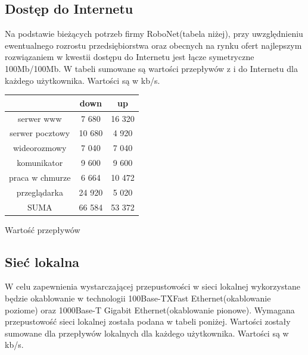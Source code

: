\documentclass{article}
\begin{document}
\subsection{Dostęp do Internetu}
Na podstawie bieżących potrzeb firmy RoboNet(tabela niżej), przy uwzględnieniu ewentualnego rozrostu przedsiębiorstwa oraz obecnych na rynku ofert najlepszym rozwiązaniem w kwestii dostępu do Internetu jest łącze symetryczne 100Mb/100Mb.\newline
W tabeli sumowane są wartości przepływów z i do Internetu dla każdego użytkownika. Wartości są w kb/s.
\newline
\begin{Tabela}[!ht]
	\centering
\begin{tabular}{|c|c|c|} \hline
	& down & up \\
	\hline
	serwer www & 7 680 & 16 320\\
	serwer pocztowy & 10 680 & 4 920\\
	wideorozmowy & 7 040 & 7 040 \\
	komunikator & 9 600 & 9 600 \\
	praca w chmurze & 6 664 & 10 472 \\
	przeglądarka & 24 920 & 5 020 \\
	\hline
	\hline
	SUMA & 66 584 & 53 372\\
	\hline
\end{tabular}
\caption{Wartość przepływów}
\end{Tabela}

\subsection{Sieć lokalna}
W celu zapewnienia wystarczającej przepustowości w sieci lokalnej wykorzystane będzie okablowanie w technologii 100Base-TXFast Ethernet(okablowanie poziome) oraz 1000Base-T Gigabit Ethernet(okablowanie pionowe).  Wymagana przepustowość sieci lokalnej została podana w tabeli poniżej. Wartości zostały sumowane dla przepływów lokalnych dla każdego użytkownika. Wartości są w kb/s.
\end{document}
